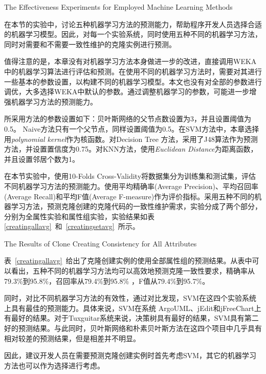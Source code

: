 {The Effectiveness Experiments for Employed Machine Learning Methods}

在本节的实验中，讨论五种机器学习方法的预测能力，帮助程序开发人员选择合适的机器学习模型。因此，对每一个实验系统，同时使用五种不同的机器学习方法，同时对需要和不需要一致性维护的克隆实例进行预测。

值得注意的是，本章没有对机器学习方法本身做进一步的改进，直接调用WEKA中的机器学习算法进行评估和预测。在使用不同的机器学习方法时，需要对其进行一些基本的参数设置，以构建不同的机器学习模型。本文也没有对全部的参数进行调优，大多选择WEKA中默认的参数。通过调整机器学习的参数，可能进一步增强机器学习方法的预测能力。

所采用方法的参数设置如下：贝叶斯网络的父节点数设置为3，并且设置阈值为0.5。 Naive方法只有一个父节点，同样设置阈值为0.5。在SVM方法中，本章选择用{\em polynomial kernel\/}作为核函数。对Decision Tree 方法，采用了J48算法作为预测方法，并设置置信度为0.75。对KNN方法，使用{\em Euclidean Distance\/}为距离函数，并且设置邻居个数为1。

在本节实验中，使用10-Folds Cross-Validity将数据集分为训练集和测试集，评估不同机器学习方法的预测能力。使用平均精确率(Average Precision)、平均召回率(Average Recall)和平均F值(Average F-measure)作为评价指标。采用五种不同的机器学习方法，预测克隆创建的克隆代码的一致性维护需求，实验分成了两个部分，分别为全属性实验和属性组实验，实验结果如表\ref{creatingallavg}~和~\ref{creatingsetavg}~所示。

{The Results of Clone Creating Consistency for All Attributes}

表~\ref{creatingallavg}~给出了克隆创建实例的使用全部属性组的预测结果。从表中可以看出，五种不同的机器学习方法均可以高效地预测克隆一致性要求，精确率从79.3\%到95.8\%，召回率从79.4\%到95.8\% ，F值从79.4\%到95.7\%。

同时，对比不同机器学习方法的有效性，通过对比发现，SVM在这四个实验系统上具有最佳的预测能力。具体来说，SVM在系统 ArgoUML、jEdit和jFreeChart上有最好的结果。对于{Tuxguitar}系统来说，决策树具有最好的结果，SVM具有第二好的预测结果。与此同时，贝叶斯网络和朴素贝叶斯方法在这四个项目中几乎具有相对较差的预测结果，但是相差并不明显。

因此，建议开发人员在需要预测克隆创建实例时首先考虑SVM，其它的机器学习方法也可以作为选择进行考虑。

